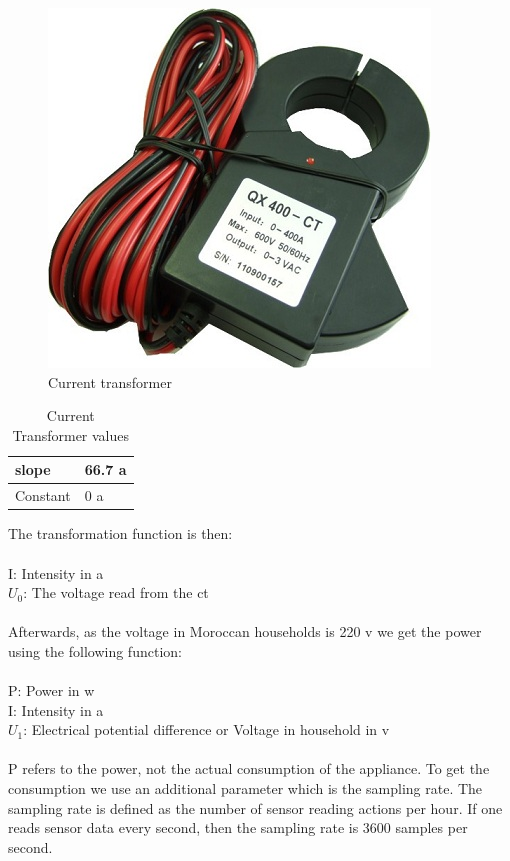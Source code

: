 \documentclass[oneside,12pt,a4paper,final]{book}
\begin{document}
\begin{figure}[htbp]
\centering
\includegraphics[scale=0.8]{img/ct.jpg}
\caption{Current transformer}
\label{fig:current_transformer}
\end{figure}

\begin{table}
    \begin{tabular}{ll}
    \hline
    slope    & 66.7 \gls{a} \\ \hline
    Constant & 0 \gls{a}    \\ \hline
    \end{tabular}
    \caption{Current Transformer values}
        \label{table:CT_vals}
\end{table}
The transformation function is then: \\
 \\
I: Intensity in \gls{a} \\
$U_0$: The voltage read from the \gls{ct}

\paragraph{}
Afterwards, as the voltage in Moroccan households is 220 \gls{v} we get the power using the following function:
\\
 \\
P: Power in \gls{w} \\
I: Intensity in \gls{a} \\
$U_1$: Electrical potential difference or Voltage in household in \gls{v}
\paragraph{}
P refers to the power, not the actual consumption of the appliance. To get the consumption we use an additional parameter which is the sampling rate. The sampling rate is defined as the number of sensor reading actions per hour. If one reads sensor data every second, then the sampling rate is 3600 samples per second.
\end{document}
